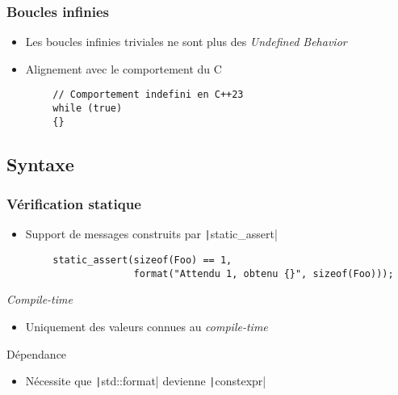 \documentclass[C++.tex]{subfiles}
\begin{document}
\begin{frame}[fragile]
	\frametitle{Boucles infinies}
	\begin{itemize}
		\item Les boucles infinies triviales ne sont plus des \textit{Undefined Behavior}
		\item Alignement avec le comportement du C
	\end{itemize}

	\begin{verbatim}
		// Comportement indefini en C++23
		while (true)
		{}
	\end{verbatim}

\end{frame}

\subsection*{Syntaxe}
\begin{frame}[fragile]
	\frametitle{Vérification statique}
	\begin{itemize}
		\item Support de messages construits par \texttt|static_assert|
	\end{itemize}

	\begin{verbatim}
		static_assert(sizeof(Foo) == 1,
		              format("Attendu 1, obtenu {}", sizeof(Foo)));
	\end{verbatim}

	\begin{alertblock}{\textit{Compile-time}}
		\begin{itemize}
			\item Uniquement des valeurs connues au \textit{compile-time}
		\end{itemize}
	\end{alertblock}

	\begin{alertblock}{Dépendance}
		\begin{itemize}
			\item Nécessite que \texttt|std::format| devienne \texttt|constexpr|
		\end{itemize}
	\end{alertblock}

\end{frame}
\end{document}
